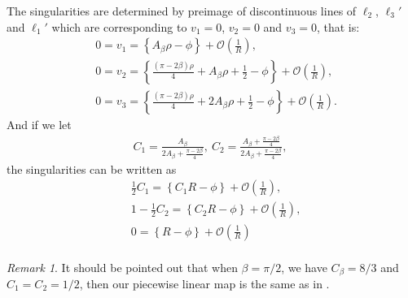 \documentclass{article}
\numberwithin{figure}{section}
\numberwithin{equation}{section}
\theoremstyle{remark}
\newtheorem*{remark}{Remark}
\theoremstyle{definition}
\begin{document}
The singularities are determined by preimage of discontinuous lines of $\ell_2$, $\ell_3'$ and $\ell_1'$ which are corresponding to ${v_1=0}$, ${v_2=0}$ and ${v_3=0}$, that is:
\begin{align*}
	&0=v_1=\left\{A_\beta\rho-\phi\right\}+\mathcal{O}\left(\frac{1}{R}\right),\\
	&0=v_2=\left\{\frac{(\pi-2\beta)\rho}{4}+A_\beta\rho+\frac{1}{2}-\phi\right\}+\mathcal{O}\left(\frac{1}{R}\right),\\
	&0=v_3=\left\{\frac{(\pi-2\beta)\rho}{4}+2A_\beta\rho+\frac{1}{2}-\phi\right\}+\mathcal{O}\left(\frac{1}{R}\right).
\end{align*}
And if we let
\begin{align*}
	C_1=\frac{A_\beta}{2A_\beta+\frac{\pi-2\beta}{4}},\ C_2=\frac{A_\beta+\frac{\pi-2\beta}{4}}{2A_\beta+\frac{\pi-2\beta}{4}},\ 
\end{align*}
the singularities can be written as
\begin{equation}
	\begin{split}
		&\frac{1}{2}C_1=\left\{C_1R-\phi\right\}+\mathcal{O}\left(\frac{1}{R}\right),\\
		&1-\frac{1}{2}C_2=\left\{C_2R-\phi\right\}+\mathcal{O}\left(\frac{1}{R}\right),\\
		&0=\left\{R-\phi\right\}+\mathcal{O}\left(\frac{1}{R}\right)\\
	\end{split}
\end{equation}
\begin{remark}
	It should be pointed out that when $\beta=\pi/2$, we have $C_\beta=8/3$ and $C_1=C_2=1/2$, then our piecewise linear map is the same as in \cite{dolgopyat_unbounded_2009}.
\end{remark}
\end{document}
